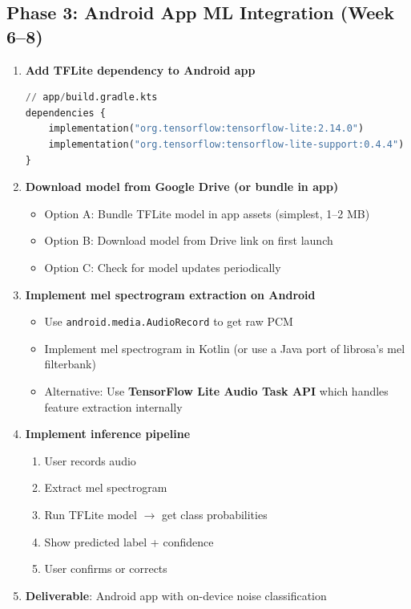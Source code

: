 \documentclass[11pt,a4paper]{article}
\begin{document}
\subsection{Phase 3: Android App ML Integration (Week 6--8)}

\begin{enumerate}[leftmargin=*,noitemsep]
    \item \textbf{Add TFLite dependency to Android app}
    \begin{lstlisting}[language=Python]
// app/build.gradle.kts
dependencies {
    implementation("org.tensorflow:tensorflow-lite:2.14.0")
    implementation("org.tensorflow:tensorflow-lite-support:0.4.4")
}
\end{lstlisting}
    
    \item \textbf{Download model from Google Drive (or bundle in app)}
    \begin{itemize}[leftmargin=*,noitemsep]
        \item Option A: Bundle TFLite model in app assets (simplest, 1--2 MB)
        \item Option B: Download model from Drive link on first launch
        \item Option C: Check for model updates periodically
    \end{itemize}
    
    \item \textbf{Implement mel spectrogram extraction on Android}
    \begin{itemize}[leftmargin=*,noitemsep]
        \item Use \texttt{android.media.AudioRecord} to get raw PCM
        \item Implement mel spectrogram in Kotlin (or use a Java port of librosa's mel filterbank)
        \item Alternative: Use \textbf{TensorFlow Lite Audio Task API} which handles feature extraction internally
    \end{itemize}
    
    \item \textbf{Implement inference pipeline}
    \begin{enumerate}
        \item User records audio
        \item Extract mel spectrogram
        \item Run TFLite model $\rightarrow$ get class probabilities
        \item Show predicted label + confidence
        \item User confirms or corrects
    \end{enumerate}
    
    \item \textbf{Deliverable}: Android app with on-device noise classification
\end{enumerate}
\end{document}
